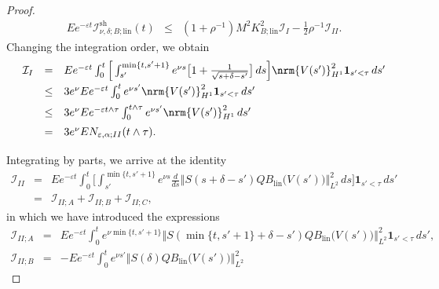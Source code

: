 \documentclass[10pt]{articleHJ}
\newcommand{\e}{\ensuremath{\varepsilon}}
\renewcommand{\d}{\ensuremath{\delta}}
\DeclarePairedDelimiter{\nrm}\lVert\rVert
\newcommand{\norm}[1]{\left\Vert#1\right\Vert}		%
\numberwithin{equation}{section}
\begin{document}
\begin{proof}
\begin{equation}
\begin{array}{lcl}
E e^{-\e t} \mathcal{I}^{\mathrm{sh}}_{\nu,\delta;B;\mathrm{lin}}(t)
& \le &
  (1 + \rho^{-1}) M^2 K^2_{B;\mathrm{lin}} \mathcal{I}_{I}
  - \frac{1}{2} \rho^{-1} \mathcal{I}_{II} .
\end{array}
\end{equation}
Changing the integration order, we obtain
\begin{equation}
\begin{array}{lcl}
 \mathcal{I}_{I} & =&
E e^{ - \e t}  \int_0^{t}
 \Big[\int_{s'}^{\min\{ t,s'+1 \} }
                      e^{\nu s}
                      \big[
                         1 + \frac{1}{\sqrt{s+\d-s'}} \big]  \, ds
                   \Big]   \nrm{V(s')}_{H^1}^2  \mathbf{1}_{s' < \tau}      \, ds '
\\[0.2cm]
& \le &
3  e^{\nu}
E e^{ - \e t }  \int_0^{t} e^{ \nu s' }  \nrm{V(s')}_{H^1}^2 \mathbf{1}_{s' < \tau}   \, ds '
\\[0.2cm]
& \le &
3  e^{\nu}
E e^{ - \e t \wedge \tau }  \int_0^{t \wedge \tau} e^{ \nu s' }  \nrm{V(s')}_{H^1}^2
   \, ds '
\\[0.2cm]
& = &
3  e^{\nu}
 E N_{\e,\alpha;II}(t\wedge\tau).
\\[0.2cm]
\end{array}
\end{equation}
Integrating by parts, we arrive at the identity
\begin{equation}
\begin{array}{lcl}
 \mathcal{I}_{II} & =&
 E e^{ - \e t}  \int_0^{t}
 \Big[\int_{s'}^{\min\{ t,s'+1 \} }
                      e^{\nu s}
                       \frac{d}{ds}
    \norm{  S(s + \delta -s') Q B_{\mathrm{lin}}\big(V(s')\big) }_{L^2}^2   \, ds
                   \Big]    \mathbf{1}_{s' < \tau}    \, ds '
 \\[0.2cm]
 & = &
   \mathcal{I}_{II;A}
   + \mathcal{I}_{II;B}
   + \mathcal{I}_{II;C},
\end{array}
\end{equation}
in which we have introduced the expressions
\begin{equation}
\begin{array}{lcl}
\mathcal{I}_{II;A}
 & = &
   E e^{ - \e t}  \int_0^{t}
     e^{\nu \min\{ t , s' + 1 \} }
       \norm{  S(\min\{t , s'+1\} + \delta -s')
         Q B_{\mathrm{lin}}\big(V(s')\big) }_{L^2}^2  \mathbf{1}_{s' < \tau} \, ds' ,
 \\[0.2cm]
\mathcal{I}_{II;B}
 & = &
   - E e^{ - \e t}  \int_0^{t}
     e^{\nu s' }
       \norm{  S(\delta) Q B_{\mathrm{lin}}\big(V(s')\big) }_{L^2}^2

\end{array}
\end{equation}
\end{proof}
\end{document}
